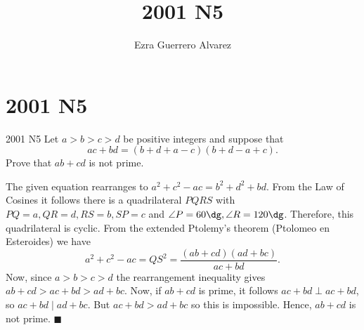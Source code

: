\documentclass[14pt]{article}
\title{2001 N5}
\author{Ezra Guerrero Alvarez}
\begin{document}
\maketitle
	
\section*{2001 N5}

\begin{statement}{2001 N5}
	Let $a > b > c > d$ be positive integers and suppose that
	\[ ac + bd = (b+d+a-c)(b+d-a+c). \]
	Prove that $ab + cd$ is not prime.
\end{statement}
The given equation rearranges to $a^2+c^2-ac=b^2+d^2+bd$. From the Law of Cosines it follows there is a quadrilateral $PQRS$ with $PQ=a,QR=d,RS=b,SP=c$ and $\angle P=60\dg,\angle R=120\dg$. Therefore, this quadrilateral is cyclic. From the extended Ptolemy's theorem (Ptolomeo en Esteroides) we have
\[ a^2+c^2-ac=QS^2=\frac{(ab+cd)(ad+bc)}{ac+bd}. \]
Now, since $a>b>c>d$ the rearrangement inequality gives $ab+cd>ac+bd>ad+bc$. Now, if $ab+cd$ is prime, it follows $ac+bd\perp ac+bd$, so $ac+bd\mid ad+bc$. But $ac+bd>ad+bc$ so this is impossible. Hence, $ab+cd$ is not prime. $\blacksquare$ 
	
\end{document}
